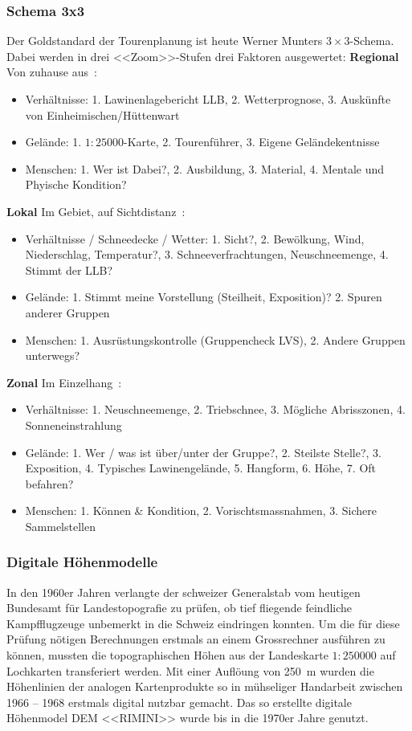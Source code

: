 \subsubsection{Schema 3x3}
Der Goldstandard der Tourenplanung ist heute Werner Munters $3\times3$-Schema. Dabei werden in drei <<Zoom>>-Stufen drei Faktoren ausgewertet:
\vfill
\textbf{Regional} 
Von zuhause aus~\cite{munter}:
\begin{itemize}
  \item Verhältnisse: 1. Lawinenlagebericht LLB, 2. Wetterprognose, 3. Auskünfte von Einheimischen/Hüttenwart
  \item Gelände: 1. $1:25000$-Karte, 2. Tourenführer, 3. Eigene Geländekentnisse
  \item Menschen: 1. Wer ist Dabei?, 2. Ausbildung, 3. Material, 4. Mentale und Phyische Kondition? 
\end{itemize}

\textbf{Lokal} Im Gebiet, auf Sichtdistanz~\cite{munter}\cite{redbull3x3}:
\begin{itemize}
  \item Verhältnisse / Schneedecke / Wetter: 1. Sicht?, 2. Bewölkung, Wind, Niederschlag, Temperatur?, 3. Schneeverfrachtungen, Neuschneemenge, 4. Stimmt der LLB?
  \item Gelände: 1. Stimmt meine Vorstellung (Steilheit, Exposition)? 2. Spuren anderer Gruppen
  \item Menschen: 1. Ausrüstungskontrolle (Gruppencheck LVS), 2. Andere Gruppen unterwegs?
\end{itemize}
\textbf{Zonal} Im Einzelhang~\cite{munter}\cite{redbull3x3}:
\begin{itemize}
  \item Verhältnisse: 1. Neuschneemenge, 2. Triebschnee, 3. Mögliche Abrisszonen, 4. Sonneneinstrahlung
  \item Gelände: 1. Wer / was ist über/unter der Gruppe?, 2. Steilste Stelle?, 3. Exposition, 4. Typisches Lawinengelände, 5. Hangform, 6. Höhe, 7. Oft befahren?
  \item Menschen: 1. Können \& Kondition, 2. Vorischtsmassnahmen, 3. Sichere Sammelstellen
\end{itemize}

\subsubsection{Digitale Höhenmodelle}

In den 1960er Jahren verlangte der schweizer Generalstab vom heutigen Bundesamt für Landestopografie zu prüfen, ob tief fliegende feindliche Kampfflugzeuge unbemerkt in die Schweiz eindringen konnten. Um die für diese Prüfung nötigen Berechnungen erstmals an einem Grossrechner ausführen zu können, mussten die topographischen Höhen aus der Landeskarte $1:250000$ auf Lochkarten transferiert werden. Mit einer Auflöung von \qty{250}{m} wurden die Höhenlinien der analogen Kartenprodukte so in mühseliger Handarbeit zwischen 1966 -- 1968 erstmals digital nutzbar gemacht. Das so erstellte digitale Höhenmodel DEM <<RIMINI>> wurde bis in die 1970er Jahre genutzt.~\cite{swisstopohistdem}

